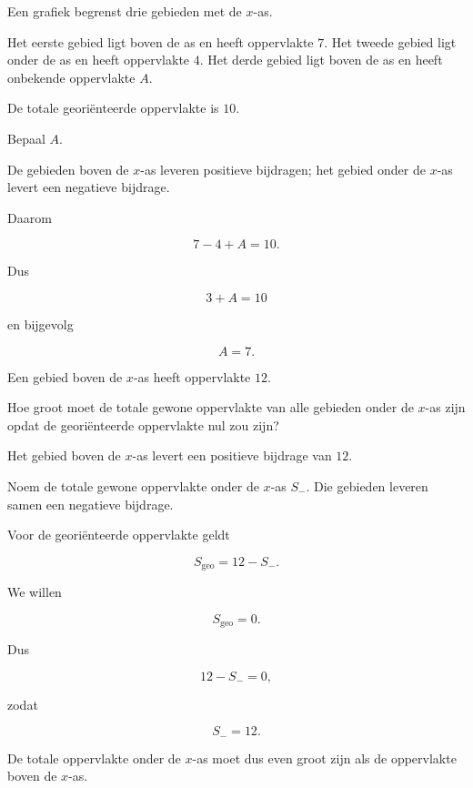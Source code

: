 \documentclass{ximera}
\begin{document}

\begin{oefening}{\oefB\ESS}

Een grafiek begrenst drie gebieden met de \(x\)-as.

Het eerste gebied ligt boven de as en heeft oppervlakte \(7\).
Het tweede gebied ligt onder de as en heeft oppervlakte \(4\).
Het derde gebied ligt boven de as en heeft onbekende oppervlakte \(A\).

De totale georiënteerde oppervlakte is \(10\).

Bepaal \(A\).

\begin{oplossing}

De gebieden boven de \(x\)-as leveren positieve bijdragen; het gebied
onder de \(x\)-as levert een negatieve bijdrage.

Daarom

\[
7-4+A=10.
\]

Dus

\[
3+A=10
\]

en bijgevolg

\[
\boxed{A=7}.
\]

\end{oplossing}

\end{oefening}



\begin{oefening}{\oefB\ESS}

Een gebied boven de \(x\)-as heeft oppervlakte \(12\).

Hoe groot moet de totale gewone oppervlakte van alle gebieden onder de
\(x\)-as zijn opdat de georiënteerde oppervlakte nul zou zijn?

\begin{oplossing}

Het gebied boven de \(x\)-as levert een positieve bijdrage van \(12\).

Noem de totale gewone oppervlakte onder de \(x\)-as \(S_-\). Die
gebieden leveren samen een negatieve bijdrage.

Voor de georiënteerde oppervlakte geldt

\[
S_{\mathrm{geo}}=12-S_-.
\]

We willen

\[
S_{\mathrm{geo}}=0.
\]

Dus

\[
12-S_-=0,
\]

zodat

\[
\boxed{S_-=12}.
\]

De totale oppervlakte onder de \(x\)-as moet dus even groot zijn als
de oppervlakte boven de \(x\)-as.

\end{oplossing}

\end{oefening}
\end{document}
